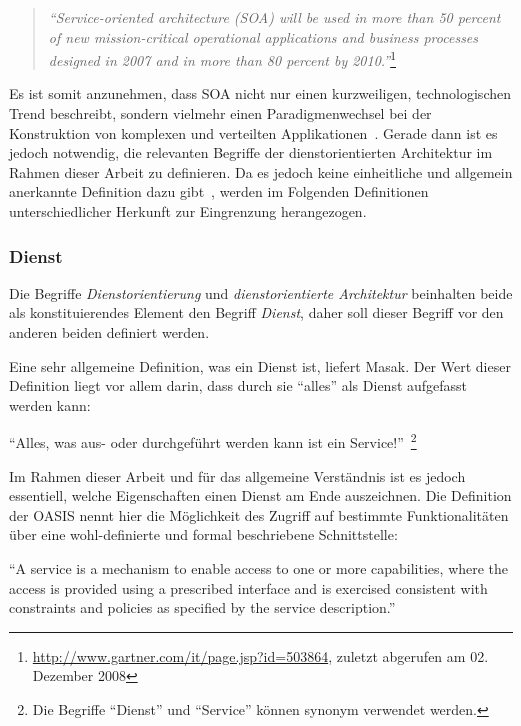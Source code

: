   \begin{quote}
    \emph{"`Service-oriented architecture (SOA) will be used in more than 50 percent of new mission-critical operational applications and business processes designed in 2007 and in more than 80 percent by 2010."'}\footnote{\url{http://www.gartner.com/it/page.jsp?id=503864}, zuletzt abgerufen am 02. Dezember 2008}
  \end{quote}
  
  Es ist somit anzunehmen, dass SOA nicht nur einen kurzweiligen, technologischen Trend beschreibt, sondern vielmehr einen Paradigmenwechsel bei der Konstruktion von komplexen und verteilten Applikationen~\citep[S. 1]{service_oriented_computing}. Gerade dann ist es jedoch notwendig, die relevanten Begriffe der dienstorientierten Architektur im Rahmen dieser Arbeit zu definieren. Da es jedoch keine einheitliche und allgemein anerkannte Definition dazu gibt~\citep[S. 6]{soa_goes_real}, werden im Folgenden Definitionen unterschiedlicher Herkunft zur Eingrenzung herangezogen.
  
\subsubsection{Dienst} %
\label{ssub:definitionen_dienst}

  Die Begriffe \emph{Dienstorientierung} und \emph{dienstorientierte Architektur} beinhalten beide als konstituierendes Element den Begriff \emph{Dienst}, daher soll dieser Begriff vor den anderen beiden definiert werden.
  
  Eine sehr allgemeine Definition, was ein Dienst ist, liefert Masak. Der Wert dieser Definition liegt vor allem darin, dass durch sie "`alles"' als Dienst aufgefasst werden kann:

\begin{definition}\label{def:dienst_allgemein_}
  "`Alles, was aus- oder durchgeführt werden kann ist ein Service!"'~\emph{\citep[S. 16]{masak2007ssb}}\footnote{Die Begriffe "`Dienst"' und "`Service"' können synonym verwendet werden.}
\end{definition}

  Im Rahmen dieser Arbeit und für das allgemeine Verständnis ist es jedoch essentiell, welche Eigenschaften einen Dienst am Ende auszeichnen. Die Definition der OASIS nennt hier die Möglichkeit des Zugriff auf bestimmte Funktionalitäten über eine wohl-definierte und formal beschriebene Schnittstelle:

\begin{definition}\label{def:dienst_oasis_}
  "`A service is a mechanism to enable access to one or more capabilities, where the access is provided using a prescribed interface and is exercised consistent with constraints and policies as specified by the service description."'~\emph{\citep[S. 12]{mackenzie2006rms}}
\end{definition}

